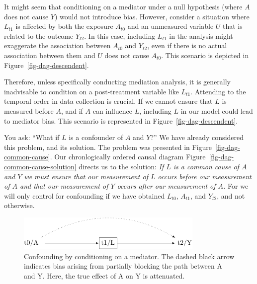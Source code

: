 \documentclass[
  singlecolumn,
  9pt]{article}
\begin{document}
It might seem that conditioning on a mediator under a null hypothesis
(where \(A\) does not cause \(Y\)) would not introduce bias. However,
consider a situation where \(L_{t1}\) is affected by both the exposure
\(A_{t0}\) and an unmeasured variable \(U\) that is related to the
outcome \(Y_{t2}\). In this case, including \(L_{t1}\) in the analysis
might exaggerate the association between \(A_{t0}\) and \(Y_{t2}\), even
if there is no actual association between them and \(U\) does not cause
\(A_{t0}\). This scenario is depicted in
Figure~\ref{fig-dag-descendent}.

Therefore, unless specifically conducting mediation analysis, it is
generally inadvisable to condition on a post-treatment variable like
\(L_{t1}\). Attending to the temporal order in data collection is
crucial. If we cannot ensure that \(L\) is measured before \(A\), and if
\(A\) can influence \(L\), including \(L\) in our model could lead to
mediator bias. This scenario is represented in
Figure~\ref{fig-dag-descendent}.

You ask: ``What if \(L\) is a confounder of \(A\) and \(Y\)?'' We have
already considered this problem, and its solution. The problem was
presented in Figure~\ref{fig-dag-common-cause}. Our chronlogically
ordered causal diagram Figure~\ref{fig-dag-common-cause-solution}
directs us to the solution: \emph{If \(L\) is a common cause of \(A\)
and \(Y\) we must ensure that our measurement of \(L\) occurs before our
measurement of \(A\) and that our measurement of \(Y\) occurs after our
measurement of \(A\).} For we will only control for confounding if we
have obtained \(L_{t0}\), \(A_{t1}\), and \(Y_{t2}\), and not otherwise.

\begin{figure}

{\centering \includegraphics[width=0.8\textwidth,height=\textheight]{causal-dags_files/figure-pdf/fig-dag-mediator-1.pdf}

}

\caption{\label{fig-dag-mediator}Confounding by conditioning on a
mediator. The dashed black arrow indicates bias arising from partially
blocking the path between A and Y. Here, the true effect of A on Y is
attenuated.}

\end{figure}
\end{document}
